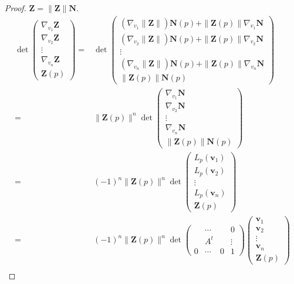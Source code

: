 \begin{proof}
	$\boldsymbol{Z} = \|\boldsymbol{Z}\|\boldsymbol{N}$.
\begingroup \allowdisplaybreaks
\begin{align*}
	\det \begin{pmatrix} 
		\nabla_{v_1} \boldsymbol{Z} \\
		\nabla_{v_2} \boldsymbol{Z} \\
		\vdots \\
		\nabla_{v_n} \boldsymbol{Z} \\
		\boldsymbol{Z}(p)
	\end{pmatrix} = & \det \begin{pmatrix}
		\left( \nabla_{v_1}\|\boldsymbol{Z}\|\right) \boldsymbol{N}(p) + \| \boldsymbol{Z}(p)\|\nabla_{v_1}\boldsymbol{N} \\
		\left( \nabla_{v_2}\|\boldsymbol{Z}\|\right) \boldsymbol{N}(p) + \| \boldsymbol{Z}(p)\|\nabla_{v_2}\boldsymbol{N} \\
		\vdots \\
		\left( \nabla_{v_n}\|\boldsymbol{Z}\|\right) \boldsymbol{N}(p) + \| \boldsymbol{Z}(p)\|\nabla_{v_n}\boldsymbol{N} \\
		\|\boldsymbol{Z}(p)\|\boldsymbol{N}(p)
	\end{pmatrix} \\
	= & \|\boldsymbol{Z}(p)\|^n \det \begin{pmatrix}
		\nabla_{v_1} \boldsymbol{N} \\
		\nabla_{v_2} \boldsymbol{N} \\
		\vdots\\
		\nabla_{v_n} \boldsymbol{N} \\
		\|\boldsymbol{Z}(p)\|\boldsymbol{N}(p)
	\end{pmatrix} \\
	= & (-1)^n \|\boldsymbol{Z}(p)\|^n \det \begin{pmatrix}
		L_p(\boldsymbol{v}_1) \\
		L_p(\boldsymbol{v}_2) \\
		\vdots \\
		L_p(\boldsymbol{v}_n) \\
		\boldsymbol{Z}(p)
	\end{pmatrix} \\
	= & (-1)^n \|\boldsymbol{Z}(p)\|^n \det \begin{pmatrix}
		& \cdots & & 0 \\
		& A^t & & \vdots \\
		0 & \cdots & 0 & 1 
		\end{pmatrix} \begin{pmatrix} \boldsymbol{v}_1 \\ \boldsymbol{v}_2 \\ \vdots \\ \boldsymbol{v}_n \\ \boldsymbol{Z}(p) \end{pmatrix} \\

\end{align*}
\end{proof}
